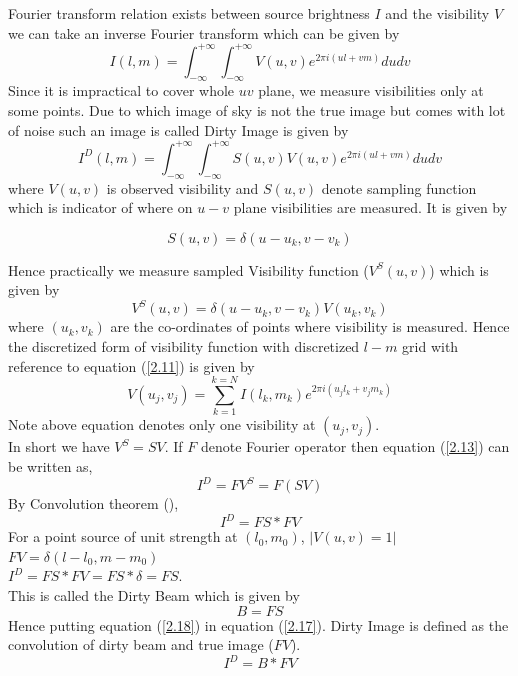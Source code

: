 Fourier transform relation exists between source brightness $I$ and the visibility $V$ we can take 
an inverse Fourier transform which can be given by
\begin{equation}
 I(l,m) = \int_{-\infty}^{+\infty}\int_{-\infty}^{+\infty} V(u,v) e^{2\pi i (ul+vm)} dudv
\label{2.12}
\end{equation}
Since it is impractical to cover whole $uv$ plane, we measure visibilities only at some points. Due to which image of sky
is not the true image but comes with lot of noise such an image is called Dirty Image is given by 
\begin{equation}
 I^D(l,m) = \int_{-\infty}^{+\infty}\int_{-\infty}^{+\infty} S(u,v) V(u,v) e^{2\pi i (ul+vm)} dudv
\label{2.13}
\end{equation}
where $V(u,v)$ is observed visibility and $S(u,v)$ denote sampling function which is indicator of where
on $u-v$ plane visibilities are measured. It is given by 

\begin{equation}
S(u,v) = \delta(u-u_k,v-v_k)
\label{2.14}
\end{equation}

Hence practically we measure sampled Visibility function ($V^S(u,v)$) which is given by
\begin{equation}
V^S(u,v) = \delta(u-u_k,v-v_k)V(u_k,v_k)
\label{2.15} 
\end{equation}
 where $(u_k,v_k)$ are the co-ordinates of points where visibility is measured. Hence
the discretized form of visibility function with discretized $l-m$ grid with reference to equation (\ref{2.11}) is
given by
\begin{equation}
 V(u_j,v_j)= \displaystyle\sum\limits_{k=1}^{k=N} I(l_k,m_k) e^{2\pi i (u_jl_k+v_jm_k)}
 \label{extra}
\end{equation}
Note above equation denotes only one visibility at $(u_j,v_j)$.\\
In short we have $V^S = SV$. If $F$ denote Fourier operator then equation (\ref{2.13}) can be written as,
\begin{equation}
 I^D = FV^S = F(SV)
\label{2.16}
\end{equation}
By Convolution theorem (\cite{bracewell}),
\begin{equation}
 I^D = FS * FV
\label{2.17}
\end{equation}
For a point source of unit strength at $(l_0,m_0)$, $|V(u,v)=1|$\\
$FV= \delta(l-l_0,m-m_0)$\\
$I^D = FS * FV = FS * \delta =  FS$. \\This is called the Dirty Beam which is given by
\begin{equation}
 B =FS
\label{2.18}
\end{equation}
Hence putting equation (\ref{2.18}) in equation (\ref{2.17}). Dirty Image is defined as the 
convolution of dirty beam and true image ($FV$).
\begin{equation}
 I^D = B * FV
\label{2.19}
\end{equation}

